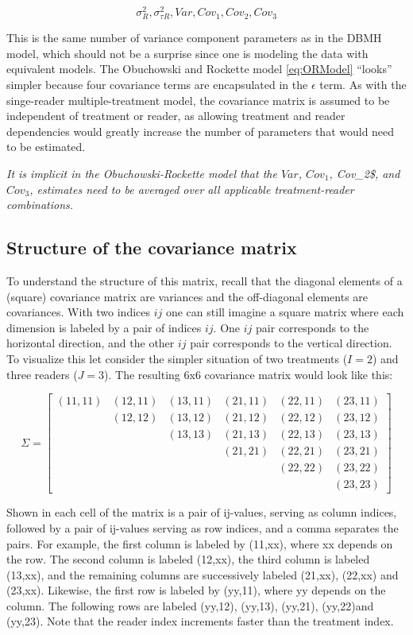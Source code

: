 \documentclass[
]{book}
\begin{document}
\[\sigma_R^2,\sigma_{\tau R}^2,Var,Cov_1,Cov_2,Cov_3\]

This is the same number of variance component parameters as in the DBMH model, which should not be a surprise since one is modeling the data with equivalent models. The Obuchowski and Rockette model \eqref{eq:ORModel} ``looks'' simpler because four covariance terms are encapsulated in the \(\epsilon\) term. As with the singe-reader multiple-treatment model, the covariance matrix is assumed to be independent of treatment or reader, as allowing treatment and reader dependencies would greatly increase the number of parameters that would need to be estimated.

\emph{It is implicit in the Obuchowski-Rockette model that the \(Var\), \(Cov_1\), Cov\_2\$, and \(Cov_3\), estimates need to be averaged over all applicable treatment-reader combinations.}

\hypertarget{StrCovMatrix}{%
\subsection{Structure of the covariance matrix}\label{StrCovMatrix}}

To understand the structure of this matrix, recall that the diagonal elements of a (square) covariance matrix are variances and the off-diagonal elements are covariances. With two indices \(ij\) one can still imagine a square matrix where each dimension is labeled by a pair of indices \(ij\). One \(ij\) pair corresponds to the horizontal direction, and the other \(ij\) pair corresponds to the vertical direction. To visualize this let consider the simpler situation of two treatments (\(I = 2\)) and three readers (\(J = 3\)). The resulting 6x6 covariance matrix would look like this:

\[
\Sigma=
\begin{bmatrix}
(11,11) & (12,11) & (13,11) & (21,11) & (22,11) & (23,11) \\
 & (12,12) & (13,12) & (21,12) & (22,12) & (23,12) \\ 
 & & (13,13) & (21,13) & (22,13) & (23,13) \\ 
 & & & (21,21) & (22,21) & (23,21) \\
 & & & & (22,22) & (23,22) \\ 
 & & & & & (23,23)
\end{bmatrix}
\]

Shown in each cell of the matrix is a pair of ij-values, serving as column indices, followed by a pair of ij-values serving as row indices, and a comma separates the pairs. For example, the first column is labeled by (11,xx), where xx depends on the row. The second column is labeled (12,xx), the third column is labeled (13,xx), and the remaining columns are successively labeled (21,xx), (22,xx) and (23,xx). Likewise, the first row is labeled by (yy,11), where yy depends on the column. The following rows are labeled (yy,12), (yy,13), (yy,21), (yy,22)and (yy,23). Note that the reader index increments faster than the treatment index.
\end{document}
